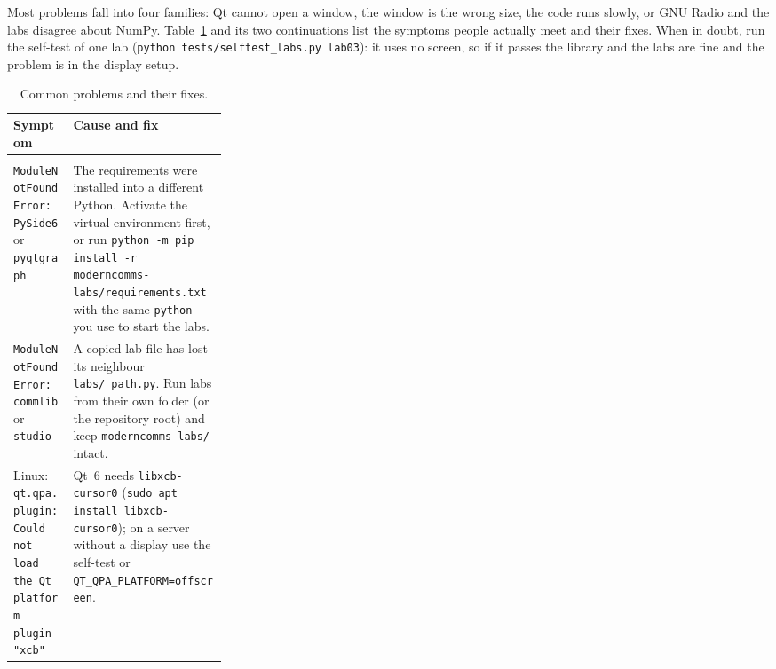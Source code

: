Most problems fall into four families: Qt cannot open a window, the window is the wrong size, the
code runs slowly, or GNU Radio and the labs disagree about NumPy. Table~\ref{tab:appB:trouble}
and its two continuations list the symptoms people actually meet and their fixes. When in doubt, run the self-test of one
lab (\texttt{python tests/selftest\_labs.py lab03}): it uses no screen, so if it passes the
library and the labs are fine and the problem is in the display setup.

\begin{table}[htbp]\centering\footnotesize
\caption{Common problems and their fixes.}\label{tab:appB:trouble}
\renewcommand{\arraystretch}{1.2}
\begin{tabularx}{\linewidth}{@{}>{\raggedright\arraybackslash}p{0.28\linewidth}>{\raggedright\arraybackslash}X@{}}
\toprule
Symptom & Cause and fix\\
\midrule
\multicolumn{2}{@{}l}{\textit{Installing and starting}}\\
\texttt{ModuleNotFoundError: PySide6} or \texttt{pyqtgraph} & The requirements were installed into a different Python. Activate the virtual environment first, or run \texttt{python -m pip install -r moderncomms-labs/requirements.txt} with the same \texttt{python} you use to start the labs.\\
\texttt{ModuleNotFoundError: commlib} or \texttt{studio} & A copied lab file has lost its neighbour \texttt{labs/\_path.py}. Run labs from their own folder (or the repository root) and keep \texttt{moderncomms-labs/} intact.\\
Linux: \texttt{qt.qpa.plugin: Could not load the Qt platform plugin "xcb"} & Qt~6 needs \texttt{libxcb-cursor0} (\texttt{sudo apt install libxcb-cursor0}); on a server without a display use the self-test or \texttt{QT\_QPA\_PLATFORM=offscreen}.\\
\bottomrule
\end{tabularx}
\end{table}

